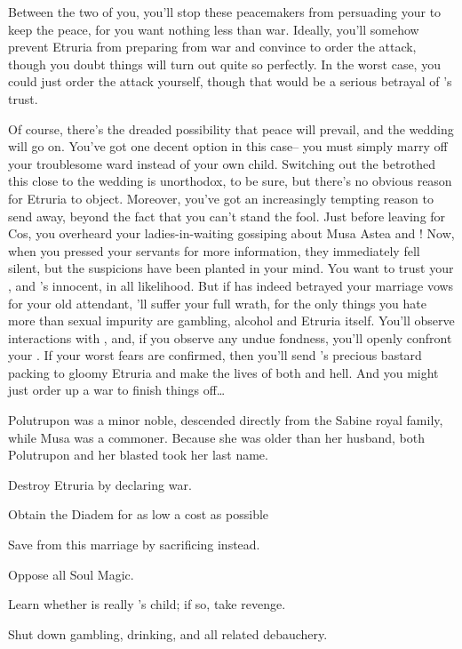 \documentclass[char]{Kos}
\begin{document}
Between the two of you, you'll stop these peacemakers from persuading your \cScythiaKing{\spouse} to keep the peace, for you want nothing less than war. Ideally, you'll somehow prevent Etruria from preparing from war and convince \cScythiaKing{} to order the attack, though you doubt things will turn out quite so perfectly. In the worst case, you could just order the attack yourself, though that would be a serious betrayal of \cScythiaKing{}'s trust.

Of course, there's the dreaded possibility that peace will prevail, and the wedding will go on. You've got one decent option in this case-- you must simply marry off your troublesome ward instead of your own child. Switching out the betrothed this close to the wedding is unorthodox, to be sure, but there's no obvious reason for Etruria to object. Moreover, you've got an increasingly tempting reason to send \cWard{\them} away,  beyond the fact that you can't stand the fool. Just before leaving for Cos, you overheard your ladies-in-waiting gossiping about Musa Astea and \cScythiaKing{}! Now, when you pressed your servants for more information, they immediately fell silent, but the suspicions have been planted in your mind. You want to trust your \cScythiaKing{\spouse}, and \cScythiaKing{\they}'s innocent, in all likelihood. But if \cScythiaKing{} has indeed betrayed your marriage vows for your old attendant, \cScythiaKing{\they}'ll suffer your full wrath, for the only things you hate more than sexual impurity are gambling, alcohol and Etruria itself. You'll observe \cScythiaKing{\their} interactions with \cWard{}, and, if you observe any undue fondness, you'll openly confront your \cScythiaKing{\spouse}. If your worst fears are confirmed, then you'll send \cScythiaKing{}'s precious bastard packing to gloomy Etruria and make the lives of both \cScythiaKing{\parent} and \cWard{\offspring} hell. And you might just order up a war to finish things off\ldots

\begin{itemz}[Notes]
  \item Polutrupon was a minor noble, descended directly from the Sabine royal family, while Musa was a commoner. Because she was older than her husband, both Polutrupon and her blasted \cWard{\offspring} took her last name.
\end{itemz}


\begin{itemz}[Goals]
\item Destroy Etruria by declaring war.
\item Obtain the Diadem for as low a cost as possible
\item Save \cBride{} from this marriage by sacrificing \cWard{} instead.
\item Oppose all Soul Magic.
\item Learn whether \cWard{} is really \cScythiaKing{}'s child; if so, take revenge.
\item Shut down gambling, drinking, and all related debauchery.
\end{itemz}
\end{document}
